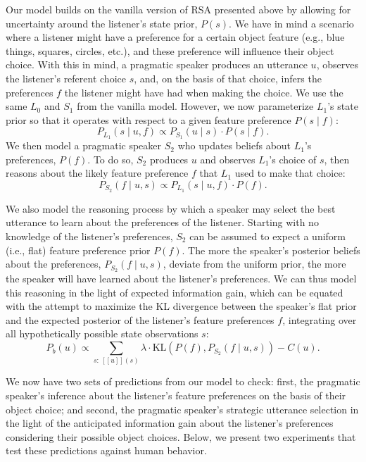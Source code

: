 \documentclass[10pt,a4paper]{article}
\begin{document}
Our model builds on the vanilla version of RSA presented above by allowing for uncertainty around the listener's state prior, $P(s)$. %
We have in mind a scenario where a listener might have a preference for a certain object feature (e.g., blue things, squares, circles, etc.), and these preference will influence their object choice. With this in mind, a pragmatic speaker produces an utterance $u$, observes the listener's referent choice $s$, and, on the basis of that choice, infers the preferences $f$ the listener might have had when making the choice.
We use the same $L_0$ and $S_1$ from the vanilla model. However, we now parameterize $L_1$'s state prior so that it operates with respect to a given feature preference $P(s\mid f)$:
$$P_{L_{1}}(s\mid u,f) \propto P_{S_{1}}(u\mid s) \cdot P(s\mid f).$$
We then model a pragmatic speaker $S_2$ who updates beliefs about $L_1$'s preferences, $P(f)$. To do so, $S_2$ produces $u$ and observes $L_1$'s choice of $s$, then reasons about the likely feature preference $f$ that $L_1$ used to make that choice:
$$P_{S_{2}}(f\mid u,s) \propto P_{L_{1}}(s\mid u,f) \cdot P(f).$$

We also model the reasoning process by which a speaker may select the best utterance to learn about the preferences of the listener.
Starting with no knowledge of the listener's preferences, $S_2$ can be assumed to expect a uniform (i.e., flat) feature preference prior $P(f)$. The more the speaker's posterior beliefs about the preferences, $P_{S_{2}}(f\mid u,s)$, deviate from the uniform prior, the more the speaker will have learned about the listener's preferences. 
We can thus model this reasoning in the light of expected information gain, which can be equated with the attempt to maximize the KL divergence between the speaker's flat prior and the expected posterior of the listener's feature preferences $f$, integrating over all hypothetically possible state observations $s$:
$$P_{b}(u) \propto \sum_{s:\  [\![u]\!](s)}\lambda \cdot \textrm{KL}(P(f),P_{S_{2}}(f\mid u,s))-C(u).$$

We now have two sets of predictions from our model to check: first, the pragmatic speaker's inference about the listener's feature preferences on the basis of their object choice; and second, the pragmatic speaker's strategic utterance selection in the light of the anticipated information gain about the listener's preferences considering their possible object choices. Below, we present two experiments that test these predictions against human behavior.
\end{document}
